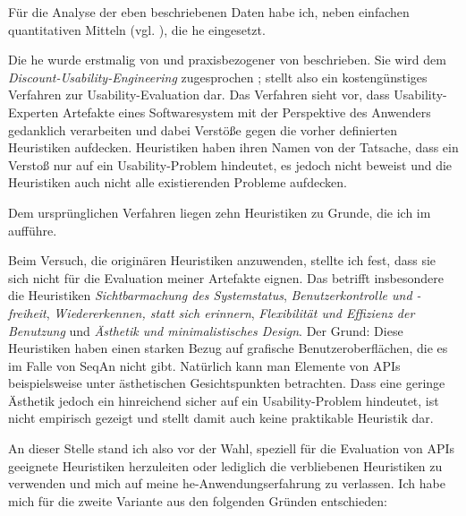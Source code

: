 Für die Analyse der eben beschriebenen Daten habe ich, neben einfachen quantitativen Mitteln (vgl. ), die \acrfull{he} eingesetzt.

Die \gls{he} wurde erstmalig von \cite{Nielsen:1990bw} und praxisbezogener von \cite{Nielsen:1994tx,Nielsen:1993vk} beschrieben. Sie wird dem \textit{Discount-Usability-Engineering} zugesprochen \citep{Sarodnick:2006vc}; stellt also ein kostengünstiges Verfahren zur Usability-Evaluation dar. Das Verfahren sieht vor, dass Usability-Experten Artefakte eines Softwaresystem mit der Perspektive des Anwenders gedanklich verarbeiten und dabei Verstöße gegen die vorher definierten Heuristiken aufdecken. Heuristiken haben ihren Namen von der Tatsache, dass ein Verstoß nur auf ein Usability-Problem hindeutet, es jedoch nicht beweist und die Heuristiken auch nicht alle existierenden Probleme aufdecken.

Dem ursprünglichen Verfahren liegen zehn Heuristiken zu Grunde, die ich im  aufführe. 

Beim Versuch, die originären Heuristiken anzuwenden, stellte ich fest, dass sie sich nicht für die Evaluation meiner Artefakte eignen. Das betrifft insbesondere die Heuristiken \textit{Sichtbarmachung des Systemstatus}, \textit{Benutzerkontrolle und -freiheit}, \textit{Wiedererkennen, statt sich erinnern}, \textit{Flexibilität und Effizienz der Benutzung} und \textit{Ästhetik und minimalistisches Design}. Der Grund: Diese Heuristiken haben einen starken Bezug auf grafische Benutzeroberflächen, die es im Falle von SeqAn nicht gibt. Natürlich kann man Elemente von APIs beispielsweise unter ästhetischen Gesichtspunkten betrachten. Dass eine geringe Ästhetik jedoch ein hinreichend sicher auf ein Usability-Problem hindeutet, ist nicht empirisch gezeigt und stellt damit auch keine praktikable Heuristik dar.   

An dieser Stelle stand ich also vor der Wahl, speziell für die Evaluation von APIs geeignete Heuristiken herzuleiten oder lediglich die verbliebenen Heuristiken zu verwenden und mich auf meine \gls{he}-Anwendungserfahrung  \citep[vgl.][]{Kahlert:2011wr} zu verlassen. Ich habe mich für die zweite Variante aus den folgenden Gründen entschieden:

